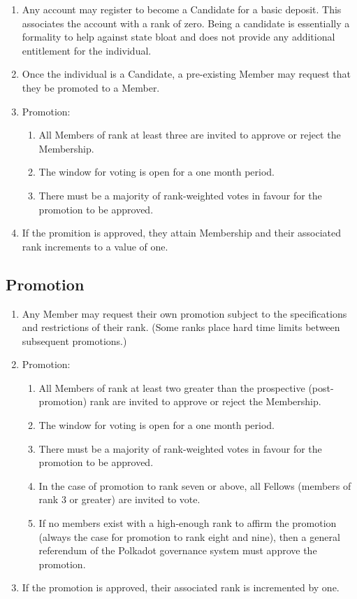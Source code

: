 \documentclass[9pt,oneside]{amsart}
\begin{document}
\begin{enumerate}
\item Any account may register to become a Candidate for a basic deposit. This associates the account with a rank of zero. Being a candidate is essentially a formality to help against state bloat and does not provide any additional entitlement for the individual.
\item Once the individual is a Candidate, a pre-existing Member may request that they be promoted to a Member.
\item Promotion:
  \begin{enumerate}
    \item All Members of rank at least three are invited to approve or reject the Membership.
    \item The window for voting is open for a one month period.
    \item There must be a majority of rank-weighted votes in favour for the promotion to be approved.
  \end{enumerate}
\item If the promition is approved, they attain Membership and their associated rank increments to a value of one.
\end{enumerate}

\subsection{Promotion}

\begin{enumerate}
\item Any Member may request their own promotion subject to the specifications and restrictions of their rank. (Some ranks place hard time limits between subsequent promotions.)
\item Promotion:
  \begin{enumerate}
    \item All Members of rank at least two greater than the prospective (post-promotion) rank are invited to approve or reject the Membership.
    \item The window for voting is open for a one month period.
    \item There must be a majority of rank-weighted votes in favour for the promotion to be approved.
    \item In the case of promotion to rank seven or above, all Fellows (members of rank 3 or greater) are invited to vote.
    \item If no members exist with a high-enough rank to affirm the promotion (always the case for promotion to rank eight and nine), then a general referendum of the Polkadot governance system must approve the promotion.
  \end{enumerate}
\item If the promotion is approved, their associated rank is incremented by one.
\end{enumerate}
\end{document}
